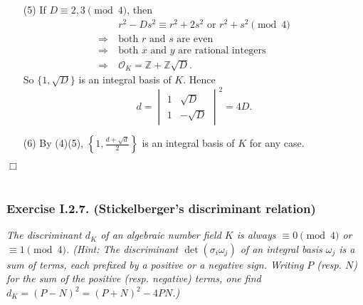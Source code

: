 \documentclass{article}
\begin{document}
\begin{enumerate}
\item[(5)]
  If $D \equiv 2, 3 \pmod 4$, then
  \begin{align*}
    &\:r^2 - Ds^2 \equiv r^2+2s^2 \text{ or } r^2+s^2 \pmod 4 \\
    \Longrightarrow &\:
    \text{both $r$ and $s$ are even} \\
    \Longrightarrow &\:
    \text{both $x$ and $y$ are rational integers} \\
    \Longrightarrow &\:
    \mathcal{O}_K = \mathbb{Z} + \mathbb{Z}\sqrt{D}.
  \end{align*}
  So $\{ 1, \sqrt{D} \}$ is an integral basis of $K$.
  Hence
  \[
    d
    =
    \begin{vmatrix}
      1 & \sqrt{D} \\
      1 & -\sqrt{D}
    \end{vmatrix}^2
    = 4D.
  \]

\item[(6)]
  By (4)(5),
  $\left\{ 1, \frac{d+\sqrt{d}}{2} \right\}$ is an integral basis of $K$
  for any case.
\end{enumerate}
$\Box$ \\\\






\subsubsection*{Exercise I.2.7. (Stickelberger's discriminant relation)}
\emph{The discriminant $d_K$ of an algebraic number field $K$ is always
$\equiv 0 \pmod 4$ or $\equiv 1 \pmod 4$.
(Hint: The discriminant $\det(\sigma_i \omega_j)$ of an integral basis $\omega_j$
is a sum of terms, each prefixed by a positive or a negative sign.
Writing $P$ (resp. $N$) for the sum of the positive (resp. negative) terms,
one find $d_K = (P-N)^2 = (P+N)^2 - 4PN$.)} \\
\end{document}
